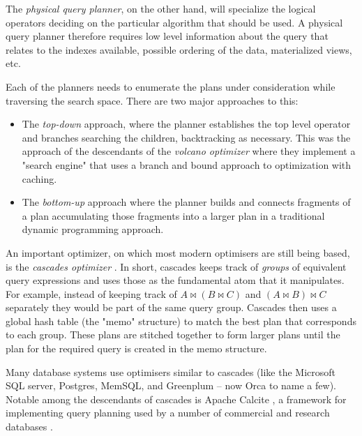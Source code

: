 The \emph{physical query planner}, on the other hand, will specialize
the logical operators deciding on the particular algorithm that should
be used. A physical query planner therefore requires low level
information about the query that relates to the indexes available,
possible ordering of the data, materialized views, etc.

Each of the planners needs to enumerate the plans under
consideration while traversing the search space. There are two major
approaches to this:

\begin{itemize}
\item The \emph{top-down} approach, where the planner establishes the
  top level operator and branches searching the children, backtracking
  as necessary. This was the approach of the descendants of the
  \emph{volcano optimizer} \cite{graefeVolcanoOptimizerGenerator1993a}
  where they implement a "search engine" that uses a branch and bound
  approach to optimization with caching.
\item The \emph{bottom-up} approach where the planner builds and
  connects fragments of a plan accumulating those fragments into a
  larger plan in a traditional dynamic programming approach.
  \cite{raasveldtDuckdbEmbeddableAnalytical2019,kemperHyPerHybridOLTP2011}
\end{itemize}

An important optimizer, on which most modern optimisers are still
being based, is the \emph{cascades optimizer}
\cite{graefeCascadesFrameworkQuery1995}. In short, cascades keeps
track of \emph{groups} of equivalent query expressions and uses those
as the fundamental atom that it manipulates. For example, instead of
keeping track of \(A \Join (B \Join C)\) and \((A \Join B) \Join C\)
separately they would be part of the same query group. Cascades then uses a
global hash table (the "memo" structure) to match the best plan that
corresponds to each group. These plans are stitched together to form larger
plans until the plan for the required query is created in the memo structure.

Many database systems use optimisers similar to cascades (like the
Microsoft SQL server, Postgres,
MemSQL\cite{chenMemSQLQueryOptimizer2016}, and Greenplum -- now Orca
\cite{solimanOrcaModularQuery2014a} to name a few). Notable among the
descendants of cascades is Apache Calcite
\cite{begoliApacheCalciteFoundational2018}, a framework for
implementing query planning used by a number of commercial and
research databases \cite{nunesalonsoBuildingPolyglotData2020}.

